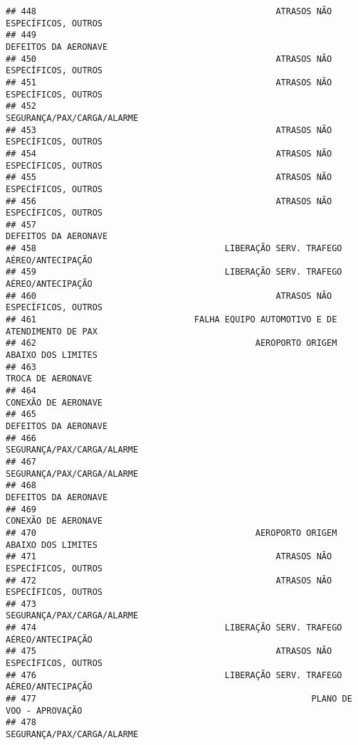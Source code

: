\documentclass[
]{article}
\begin{document}
\begin{verbatim}
## 448                                               ATRASOS NÃO ESPECÍFICOS, OUTROS
## 449                                                          DEFEITOS DA AERONAVE
## 450                                               ATRASOS NÃO ESPECÍFICOS, OUTROS
## 451                                               ATRASOS NÃO ESPECÍFICOS, OUTROS
## 452                                                    SEGURANÇA/PAX/CARGA/ALARME
## 453                                               ATRASOS NÃO ESPECÍFICOS, OUTROS
## 454                                               ATRASOS NÃO ESPECÍFICOS, OUTROS
## 455                                               ATRASOS NÃO ESPECÍFICOS, OUTROS
## 456                                               ATRASOS NÃO ESPECÍFICOS, OUTROS
## 457                                                          DEFEITOS DA AERONAVE
## 458                                     LIBERAÇÃO SERV. TRAFEGO AÉREO/ANTECIPAÇÃO
## 459                                     LIBERAÇÃO SERV. TRAFEGO AÉREO/ANTECIPAÇÃO
## 460                                               ATRASOS NÃO ESPECÍFICOS, OUTROS
## 461                               FALHA EQUIPO AUTOMOTIVO E DE ATENDIMENTO DE PAX
## 462                                           AEROPORTO ORIGEM ABAIXO DOS LIMITES
## 463                                                             TROCA DE AERONAVE
## 464                                                           CONEXÃO DE AERONAVE
## 465                                                          DEFEITOS DA AERONAVE
## 466                                                    SEGURANÇA/PAX/CARGA/ALARME
## 467                                                    SEGURANÇA/PAX/CARGA/ALARME
## 468                                                          DEFEITOS DA AERONAVE
## 469                                                           CONEXÃO DE AERONAVE
## 470                                           AEROPORTO ORIGEM ABAIXO DOS LIMITES
## 471                                               ATRASOS NÃO ESPECÍFICOS, OUTROS
## 472                                               ATRASOS NÃO ESPECÍFICOS, OUTROS
## 473                                                    SEGURANÇA/PAX/CARGA/ALARME
## 474                                     LIBERAÇÃO SERV. TRAFEGO AÉREO/ANTECIPAÇÃO
## 475                                               ATRASOS NÃO ESPECÍFICOS, OUTROS
## 476                                     LIBERAÇÃO SERV. TRAFEGO AÉREO/ANTECIPAÇÃO
## 477                                                      PLANO DE VOO - APROVAÇÃO
## 478                                                    SEGURANÇA/PAX/CARGA/ALARME

\end{verbatim}
\end{document}
